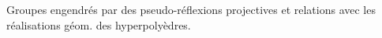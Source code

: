 
Groupes engendrés par des pseudo-réflexions projectives et relations avec les réalisations géom. des \unsure{\textquotedblleft|\textquotedblright}hyperpolyèdres.

